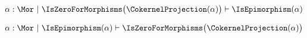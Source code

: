 \begin{sequent}
\begin{align*}
  \alpha: \Mor ~|~ \IsZeroForMorphisms\big( \CokernelProjection( \alpha ) \big) \vdash \IsEpimorphism( \alpha )
\end{align*}
\end{sequent}

\begin{sequent}
\begin{align*}
  \alpha: \Mor ~|~  \IsEpimorphism( \alpha ) \vdash \IsZeroForMorphisms\big( \CokernelProjection( \alpha ) \big)
\end{align*}
\end{sequent}
